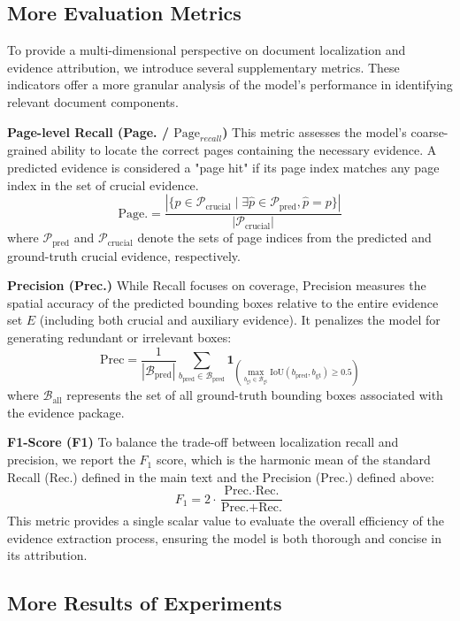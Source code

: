 \documentclass{llmxive}
\begin{document}
{{{\subsection{More Evaluation Metrics}
\label{Appendix: More Evaluation Metrics}
To provide a multi-dimensional perspective on document localization and evidence attribution, we introduce several supplementary metrics. These indicators offer a more granular analysis of the model's performance in identifying relevant document components.

\textbf{Page-level Recall (Page. / $\text{Page}_{recall}$)} This metric assesses the model's coarse-grained ability to locate the correct pages containing the necessary evidence. A predicted evidence is considered a "page hit" if its page index matches any page index in the set of crucial evidence.
\[
\text{Page.} = \frac{|\{p \in \mathcal{P}_{\text{crucial}} \mid \exists \hat{p} \in \mathcal{P}_{\text{pred}}, \hat{p} = p\}|}{|\mathcal{P}_{\text{crucial}}|}
\]
where $\mathcal{P}_{\text{pred}}$ and $\mathcal{P}_{\text{crucial}}$ denote the sets of page indices from the predicted and ground-truth crucial evidence, respectively.

\textbf{Precision (Prec.)} While Recall focuses on coverage, Precision measures the spatial accuracy of the predicted bounding boxes relative to the entire evidence set $E$ (including both crucial and auxiliary evidence). It penalizes the model for generating redundant or irrelevant boxes:
\[
\text{Prec} = \frac{1}{|\mathcal{B}_{\text{pred}}|} \sum_{b_{\text{pred}} \in \mathcal{B}_{\text{pred}}} \mathbf{1}_{\left( \max_{b_{\text{gt}} \in \mathcal{B}_{\text{gt}}} \text{IoU}(b_{\text{pred}}, b_{\text{gt}}) \ge 0.5 \right)}
\]
where $\mathcal{B}_{\text{all}}$ represents the set of all ground-truth bounding boxes associated with the evidence package.

\textbf{F1-Score (F1)} To balance the trade-off between localization recall and precision, we report the $F_1$ score, which is the harmonic mean of the standard Recall ($\text{Rec.}$) defined in the main text and the Precision ($\text{Prec.}$) defined above:
\[
F_1 = 2 \cdot \frac{\text{Prec.} \cdot \text{Rec.}}{\text{Prec.} + \text{Rec.}}
\]
This metric provides a single scalar value to evaluate the overall efficiency of the evidence extraction process, ensuring the model is both thorough and concise in its attribution.

\subsection{More Results of Experiments}
\label{Appendix: More Results of Experiments}
}}}
\end{document}
